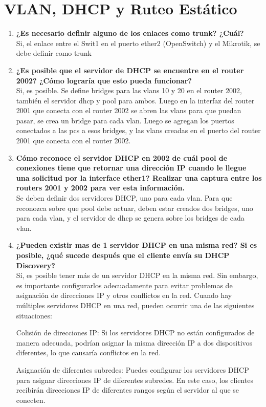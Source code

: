 \documentclass[a4paper]{article}
\begin{document}
\section*{VLAN, DHCP y Ruteo Estático}
\begin{enumerate}
	\item \textbf{¿Es necesario definir alguno de los enlaces como trunk? ¿Cuál?
}
	\\ Si, el enlace entre el Swit1 en el puerto ether2 (OpenSwitch) y el Mikrotik, se debe definir como trunk
	\item \textbf{¿Es posible que el servidor de DHCP se encuentre en el router
2002? ¿Cómo lograría que esto pueda funcionar?
}
	\\Si, es posible. Se define bridges para las vlans 10 y 20 en el router 2002, también el servidor dhcp y pool para ambos. 
	Luego en la interfaz del router 2001 que conecta con el router 2002 se abren las vlans para que puedan pasar, se crea un bridge para cada vlan. Luego se agregan los puertos conectados a las pcs a esos bridges, y las vlans creadas en el puerto del router 2001 que conecta con el router 2002.
	
	\item \textbf{Cómo reconoce el servidor DHCP en 2002 de cuál pool de
		conexiones tiene que retornar una dirección IP cuando le llegue una solicitud por la interface ether1? Realizar una captura
		entre los routers 2001 y 2002 para ver esta información.
	}
\\
Se deben definir dos servidores DHCP, uno para cada vlan. Para que reconozca sobre que pool debe actuar, deben estar creados dos bridges, uno para cada vlan, y el servidor de dhcp se genera sobre los bridges de cada vlan.
	\item \textbf{ ¿Pueden existir mas de 1 servidor DHCP en una misma red?
	Si es posible, ¿qué sucede después que el cliente envía su
	DHCP Discovery?}
	\\
	Sí, es posible tener más de un servidor DHCP en la misma red. Sin embargo, es importante configurarlos adecuadamente para evitar problemas de asignación de direcciones IP y otros conflictos en la red. Cuando hay múltiples servidores DHCP en una red, pueden ocurrir una de las siguientes situaciones:
	
	Colisión de direcciones IP: Si los servidores DHCP no están configurados de manera adecuada, podrían asignar la misma dirección IP a dos dispositivos diferentes, lo que causaría conflictos en la red.
	
	Asignación de diferentes subredes: Puedes configurar los servidores DHCP para asignar direcciones IP de diferentes subredes. En este caso, los clientes recibirán direcciones IP de diferentes rangos según el servidor al que se conecten.
	

\end{enumerate}
\end{document}
